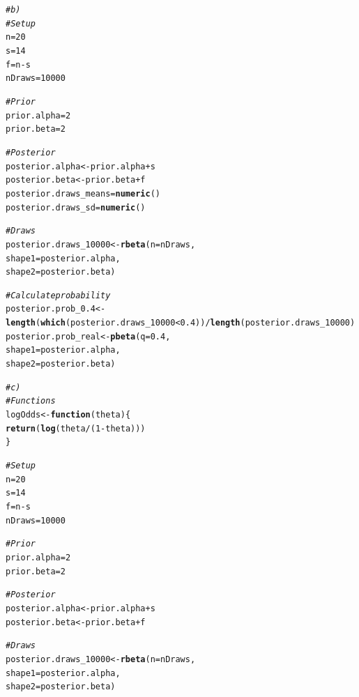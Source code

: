 \documentclass{article}\usepackage[]{graphicx}\usepackage[]{color}
\makeatletter
\newcommand{\hlnum}[1]{\textcolor[rgb]{0.686,0.059,0.569}{#1}}%
\newcommand{\hlcom}[1]{\textcolor[rgb]{0.678,0.584,0.686}{\textit{#1}}}%
\newcommand{\hlopt}[1]{\textcolor[rgb]{0,0,0}{#1}}%
\newcommand{\hlstd}[1]{\textcolor[rgb]{0.345,0.345,0.345}{#1}}%
\newcommand{\hlkwa}[1]{\textcolor[rgb]{0.161,0.373,0.58}{\textbf{#1}}}%
\newcommand{\hlkwb}[1]{\textcolor[rgb]{0.69,0.353,0.396}{#1}}%
\newcommand{\hlkwc}[1]{\textcolor[rgb]{0.333,0.667,0.333}{#1}}%
\newcommand{\hlkwd}[1]{\textcolor[rgb]{0.737,0.353,0.396}{\textbf{#1}}}%
\newenvironment{kframe}{%
 \def\at@end@of@kframe{}%
 \ifinner\ifhmode%
  \def\at@end@of@kframe{\end{minipage}}%
  \begin{minipage}{\columnwidth}%
 \fi\fi%
 \def\FrameCommand##1{\hskip\@totalleftmargin \hskip-\fboxsep
 \colorbox{shadecolor}{##1}\hskip-\fboxsep
     \hskip-\linewidth \hskip-\@totalleftmargin \hskip\columnwidth}%
 \MakeFramed {\advance\hsize-\width
   \@totalleftmargin\z@ \linewidth\hsize
   \@setminipage}}%
 {\par\unskip\endMakeFramed%
 \at@end@of@kframe}
\newenvironment{knitrout}{}{} %
\makeatother
\begin{document}
\begin{knitrout}
{}


\begin{kframe}\begin{alltt}
\hlcom{# b) }
\hlcom{# Setup}
\hlstd{n} \hlkwb{=} \hlnum{20}
\hlstd{s} \hlkwb{=} \hlnum{14}
\hlstd{f} \hlkwb{=} \hlstd{n} \hlopt{-} \hlstd{s}
\hlstd{nDraws} \hlkwb{=} \hlnum{10000}

\hlcom{# Prior}
\hlstd{prior.alpha} \hlkwb{=} \hlnum{2}
\hlstd{prior.beta} \hlkwb{=} \hlnum{2}

\hlcom{# Posterior}
\hlstd{posterior.alpha} \hlkwb{<-} \hlstd{prior.alpha} \hlopt{+} \hlstd{s}
\hlstd{posterior.beta} \hlkwb{<-} \hlstd{prior.beta} \hlopt{+} \hlstd{f}
\hlstd{posterior.draws_means} \hlkwb{=} \hlkwd{numeric}\hlstd{()}
\hlstd{posterior.draws_sd} \hlkwb{=} \hlkwd{numeric}\hlstd{()}

\hlcom{# Draws}
\hlstd{posterior.draws_10000} \hlkwb{<-} \hlkwd{rbeta}\hlstd{(}\hlkwc{n} \hlstd{= nDraws,}
                               \hlkwc{shape1} \hlstd{= posterior.alpha,}
                               \hlkwc{shape2} \hlstd{= posterior.beta)}

\hlcom{# Calculate probability}
\hlstd{posterior.prob_0.4} \hlkwb{<-} \hlkwd{length}\hlstd{(}\hlkwd{which}\hlstd{(posterior.draws_10000} \hlopt{<} \hlnum{0.4}\hlstd{))}\hlopt{/}\hlkwd{length}\hlstd{(posterior.draws_10000)}
\hlstd{posterior.prob_real}\hlkwb{<-} \hlkwd{pbeta}\hlstd{(}\hlkwc{q} \hlstd{=} \hlnum{0.4}\hlstd{,}
                            \hlkwc{shape1} \hlstd{= posterior.alpha,}
                            \hlkwc{shape2} \hlstd{= posterior.beta)}

\hlcom{# c)}
\hlcom{# Functions}
\hlstd{logOdds} \hlkwb{<-} \hlkwa{function}\hlstd{(}\hlkwc{theta}\hlstd{) \{}
  \hlkwd{return} \hlstd{(}\hlkwd{log}\hlstd{(theta}\hlopt{/}\hlstd{(}\hlnum{1}\hlopt{-}\hlstd{theta)))}
\hlstd{\}}

\hlcom{# Setup}
\hlstd{n} \hlkwb{=} \hlnum{20}
\hlstd{s} \hlkwb{=} \hlnum{14}
\hlstd{f} \hlkwb{=} \hlstd{n} \hlopt{-} \hlstd{s}
\hlstd{nDraws} \hlkwb{=} \hlnum{10000}

\hlcom{# Prior}
\hlstd{prior.alpha} \hlkwb{=} \hlnum{2}
\hlstd{prior.beta} \hlkwb{=} \hlnum{2}

\hlcom{# Posterior}
\hlstd{posterior.alpha} \hlkwb{<-} \hlstd{prior.alpha} \hlopt{+} \hlstd{s}
\hlstd{posterior.beta} \hlkwb{<-} \hlstd{prior.beta} \hlopt{+} \hlstd{f}

\hlcom{# Draws}
\hlstd{posterior.draws_10000} \hlkwb{<-} \hlkwd{rbeta}\hlstd{(}\hlkwc{n} \hlstd{= nDraws,}
                               \hlkwc{shape1} \hlstd{= posterior.alpha,}
                               \hlkwc{shape2} \hlstd{= posterior.beta)}


\end{alltt}
\end{kframe}
\end{knitrout}
\end{document}
